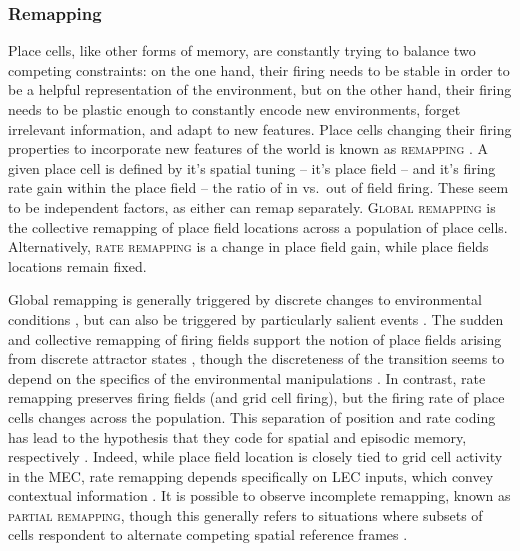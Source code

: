 \subsubsection{Remapping}
\label{sec:intro:memory:remapping}
Place cells, like other forms of memory, are constantly trying to balance two competing constraints: on the one hand, their firing needs to be stable in order to be a helpful representation of the environment, but on the other hand, their firing needs to be plastic enough to constantly encode new environments, forget irrelevant information, and adapt to new features.
Place cells changing their firing properties to incorporate new features of the world is known as \textsc{remapping} \citep{Muller1987, Leutgeb2005a, Colgin2008}.
A given place cell is defined by it's spatial tuning -- it's place field -- and it's firing rate gain within the place field -- the ratio of in vs.~out of field firing.
These seem to be independent factors, as either can remap separately.
\textsc{Global remapping} is the collective remapping of place field locations across a population of place cells.
Alternatively, \textsc{rate remapping} is a change in place field gain, while place fields locations remain fixed.

Global remapping is generally triggered by discrete changes to environmental conditions \citep{Leutgeb2004, Leutgeb2005a}, but can also be triggered by particularly salient events \citep{Moita2004}.
The sudden and collective remapping of firing fields support the notion of place fields arising from discrete attractor states \citep{Jeffery2011a}, though the discreteness of the transition seems to depend on the specifics of the environmental manipulations \citep{Wills2005, Leutgeb2005b, Jezek2011}.
In contrast, rate remapping preserves firing fields (and grid cell firing), but the firing rate of place cells changes across the population.
This separation of position and rate coding has lead to the hypothesis that they code for spatial and episodic memory, respectively \citep{Leutgeb2005a}.
Indeed, while place field location is closely tied to grid cell activity in the \ac{MEC}, rate remapping depends specifically on \ac{LEC} inputs, which convey contextual information \citep{Lu2013}.
It is possible to observe incomplete remapping, known as \textsc{partial remapping}, though this generally refers to situations where subsets of cells respondent to alternate competing spatial reference frames \citep{Skaggs1998, Colgin2008}.

